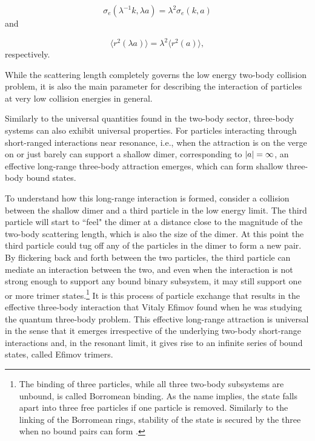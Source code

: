 \begin{equation}
\sigma_e(\lambda^{-1}k,\lambda a) = \lambda^2 \sigma_e(k,a)
\end{equation}
and

\begin{equation}
\langle r^2(\lambda a)\rangle = \lambda^2 \langle r^2(a)\rangle ,
\end{equation}
respectively. 

While the scattering length completely governs the low energy two-body collision problem, it is also the main parameter for describing the interaction of particles at very low collision energies in general. 

Similarly to the universal quantities found in the two-body sector, three-body systems can also exhibit universal properties. For particles interacting through short-ranged interactions near resonance, i.e., when the attraction is on the verge on or just barely can support a shallow dimer, corresponding to $\lvert a\rvert=\infty$, an effective long-range three-body attraction emerges, which can form shallow three-body bound states.

To understand how this long-range interaction is formed, consider a collision between the shallow dimer and a third particle in the low energy limit. The third particle will start to ``feel" the dimer at a distance close to the magnitude of the two-body scattering length, which is also the size of the dimer. At this point the third particle could tug off any of the particles in the dimer to form a new pair. By flickering back and forth between the two particles, the third particle can mediate an interaction between the two, and even when the interaction is not strong enough to support any bound binary subsystem, it may still support one or more trimer states.\footnote{The binding of three particles, while all three two-body subsystems are unbound, is called Borromean binding. As the name implies, the state falls apart into three free particles if one particle is removed. Similarly to the linking of the Borromean rings, stability of the state is secured by the three when no bound pairs can form \cite{Kajsa_my}.} It is this process of particle exchange that results in the effective three-body interaction that Vitaly Efimov found when he was studying the quantum three-body problem. This effective long-range attraction is universal in the sense that it emerges irrespective of the underlying two-body short-range interactions and, in the resonant limit, it gives rise to an infinite series of bound states, called Efimov trimers.


